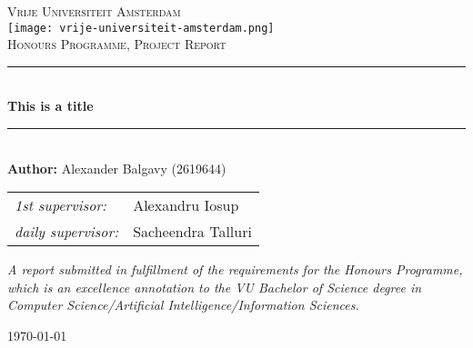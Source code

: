 \def\theauthor{Alexander Balgavy (2619644)}
\def\thetitle{This is a title}
\def\thedate{\today}
\def\theinstitution{Vrije Universiteit Amsterdam}
\def\thesubject{Honours Programme, Project Report}

\begin{titlepage}
    \newcommand{\HRule}{\rule{0.8\linewidth}{0.2mm}}

    \centering

    \vspace*{6em}

    \textsc{\large \theinstitution}\\[1em]

    \texttt{[image: vrije-universiteit-amsterdam.png]}\\
    \vspace{4em}
    \textsc{\Large \thesubject}\\
    \vspace{4em}

    \HRule\\[0.7cm]

    {\huge\bfseries \thetitle}\\[0.4cm]

    \HRule\\[1.5cm]

    {\Large \textbf{Author:} \theauthor}\\
    \vspace{2em}
    \begin{minipage}{0.7\textwidth}
      \large
      \centering
      \begin{tabular}{ l l }
        \textit{1st supervisor:}      & Alexandru Iosup\\
        \textit{daily supervisor:}    & Sacheendra Talluri
      \end{tabular}
    \end{minipage}

    \vfill
    \begin{minipage}{0.8\textwidth}
      \centering
      \textit{\large
        A report submitted in fulfillment of the requirements for the Honours Programme, which is an excellence annotation to the VU Bachelor of Science
        degree in Computer Science/Artificial Intelligence/Information Sciences.
      }
    \end{minipage}

    \vspace{2em}
    {\large\today}

    \vspace{4em}
\end{titlepage}
